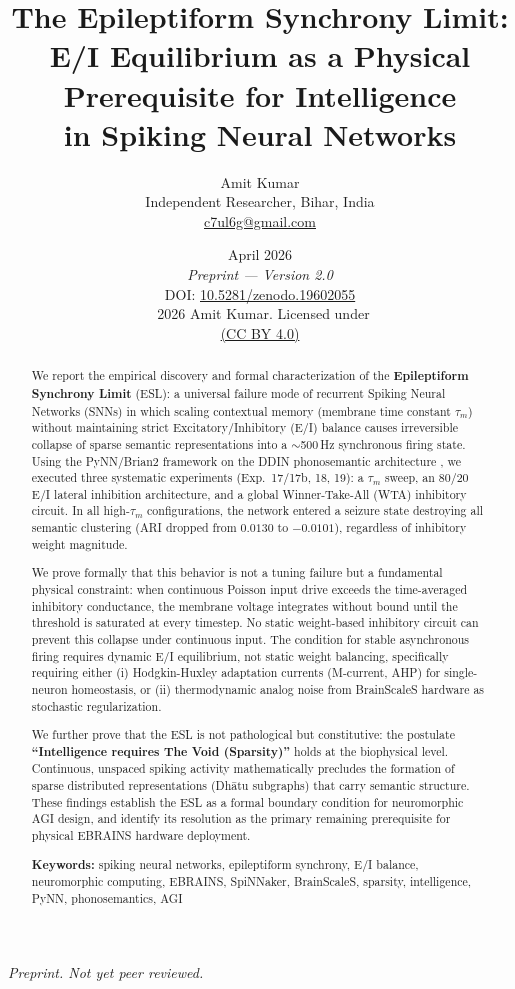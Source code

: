 \documentclass{article}
\title{\textbf{The Epileptiform Synchrony Limit:\\
E/I Equilibrium as a Physical Prerequisite for Intelligence\\
in Spiking Neural Networks}}
\author{Amit Kumar\\
\small Independent Researcher, Bihar, India\\
\small \href{mailto:c7ul6g@gmail.com}{c7ul6g@gmail.com}}
\date{%
  April 2026\\[4pt]
  \small\textit{Preprint — Version 2.0}\\[2pt]
  \small DOI: \href{https://doi.org/10.5281/zenodo.19602055}{10.5281/zenodo.19602055}\\[2pt]
  \small\textcopyright\ 2026 Amit Kumar. Licensed under\\
  \small\href{https://creativecommons.org/licenses/by/4.0/}{ (CC BY 4.0)}%
}
\begin{document}
\maketitle

\begin{center}
\small\textit{Preprint. Not yet peer reviewed.}
\end{center}

\begin{abstract}
We report the empirical discovery and formal characterization of the \textbf{Epileptiform Synchrony Limit} (ESL): a universal failure mode of recurrent Spiking Neural Networks (SNNs) in which scaling contextual memory (membrane time constant $\tau_m$) without maintaining strict Excitatory/Inhibitory (E/I) balance causes irreversible collapse of sparse semantic representations into a $\sim$500\,Hz synchronous firing state. Using the PyNN/Brian2 framework on the DDIN phonosemantic architecture \citep{kumar2026ddin}, we executed three systematic experiments (Exp.~17/17b, 18, 19): a $\tau_m$ sweep, an 80/20 E/I lateral inhibition architecture, and a global Winner-Take-All (WTA) inhibitory circuit. In all high-$\tau_m$ configurations, the network entered a seizure state destroying all semantic clustering (ARI dropped from $0.0130$ to $-0.0101$), regardless of inhibitory weight magnitude.

We prove formally that this behavior is not a tuning failure but a fundamental physical constraint: when continuous Poisson input drive exceeds the time-averaged inhibitory conductance, the membrane voltage integrates without bound until the threshold is saturated at every timestep. No static weight-based inhibitory circuit can prevent this collapse under continuous input. The condition for stable asynchronous firing requires dynamic E/I equilibrium, not static weight balancing, specifically requiring either (i) Hodgkin-Huxley adaptation currents (M-current, AHP) for single-neuron homeostasis, or (ii) thermodynamic analog noise from BrainScaleS hardware as stochastic regularization.

We further prove that the ESL is not pathological but constitutive: the postulate \textbf{``Intelligence requires The Void (Sparsity)''} holds at the biophysical level. Continuous, unspaced spiking activity mathematically precludes the formation of sparse distributed representations (Dh\={a}tu subgraphs) that carry semantic structure. These findings establish the ESL as a formal boundary condition for neuromorphic AGI design, and identify its resolution as the primary remaining prerequisite for physical EBRAINS hardware deployment.

\smallskip
\noindent\textbf{Keywords:} spiking neural networks, epileptiform synchrony, E/I balance, neuromorphic computing, EBRAINS, SpiNNaker, BrainScaleS, sparsity, intelligence, PyNN, phonosemantics, AGI
\end{abstract}
\end{document}
